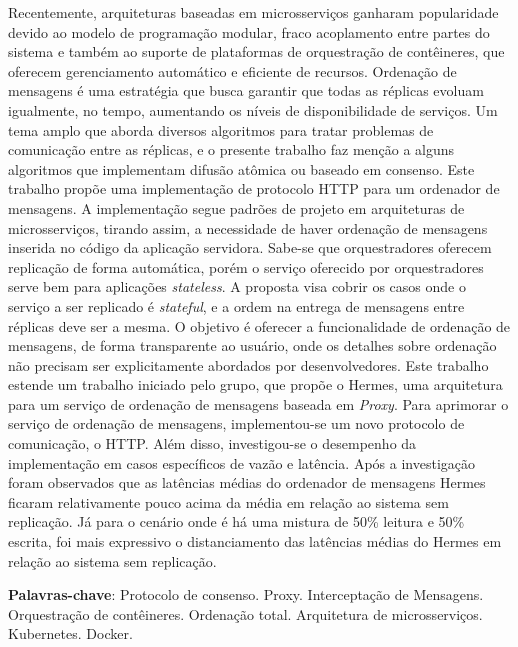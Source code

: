 \setlength{\absparsep}{18pt}
\begin{resumo}
\SingleSpacing

Recentemente, arquiteturas baseadas em microsserviços ganharam popularidade devido ao modelo de programação modular, fraco acoplamento entre partes do sistema e também ao suporte de plataformas de orquestração de contêineres, que oferecem gerenciamento automático e eficiente de recursos.
Ordenação de mensagens é uma estratégia que busca garantir que todas as réplicas evoluam igualmente, no tempo, aumentando os níveis de disponibilidade de serviços. Um tema amplo que aborda diversos algoritmos para tratar problemas de comunicação entre as réplicas, e o presente trabalho faz menção a alguns algoritmos que implementam difusão atômica ou baseado em consenso.
Este trabalho propõe uma implementação de protocolo HTTP para um ordenador de mensagens. A implementação segue padrões de projeto em arquiteturas de microsserviços, tirando assim, a necessidade de haver ordenação de mensagens inserida no código da aplicação servidora.
Sabe-se que orquestradores oferecem replicação de forma automática, porém o serviço oferecido por orquestradores serve bem para aplicações \textit{stateless}. A proposta visa cobrir os casos onde o serviço a ser replicado é \textit{stateful}, e a ordem na entrega de mensagens entre réplicas deve ser a mesma.
O objetivo é oferecer a funcionalidade de ordenação de mensagens, de forma transparente ao usuário, onde os detalhes sobre ordenação não precisam ser explicitamente abordados por desenvolvedores.
Este trabalho estende um trabalho iniciado pelo grupo, que propõe o Hermes, uma arquitetura para um serviço de ordenação de mensagens baseada em \textit{Proxy}.
Para aprimorar o serviço de ordenação de mensagens, implementou-se um novo protocolo de comunicação, o HTTP. Além disso, investigou-se o desempenho da implementação em casos específicos de vazão e latência.
Após a investigação foram observados que as latências médias do ordenador de mensagens Hermes ficaram relativamente pouco acima da média em relação ao sistema sem replicação. Já para o cenário onde é há uma mistura de 50\% leitura e 50\% escrita, foi mais expressivo o distanciamento das latências médias do Hermes em relação ao sistema sem replicação.

\textbf{Palavras-chave}: Protocolo de consenso. Proxy. Interceptação de Mensagens. Orquestração de contêineres. Ordenação total. Arquitetura de microsserviços. Kubernetes. Docker.
\end{resumo}
